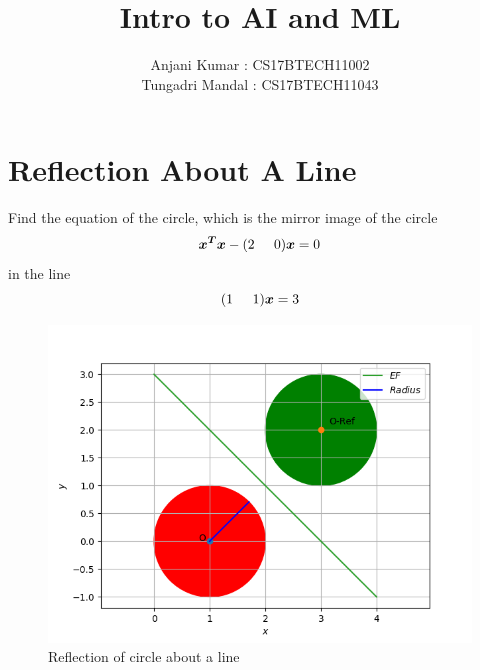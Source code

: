 \documentclass[12pt]{article}
\begin{document}
 
 
\title{Intro to AI and ML}
\author{Anjani Kumar : CS17BTECH11002\\ %
Tungadri Mandal : CS17BTECH11043}

\maketitle
\section{Reflection About A Line }
Find the equation of the circle, which is the
mirror image of the circle
\begin{equation}
    \boldsymbol{x^Tx} - (2\hspace{5mm} 0)\boldsymbol{x} = 0
\end{equation}
in the line 
\begin{equation}
    (1\hspace{5mm} 1)\boldsymbol{x} = 3
\end{equation}


\begin{figure}[h]
\centering
\includegraphics[scale=0.65]{figs/circles.png}
\caption{Reflection of circle about a line}
\label{etiqueta}
\end{figure}
\end{document}
